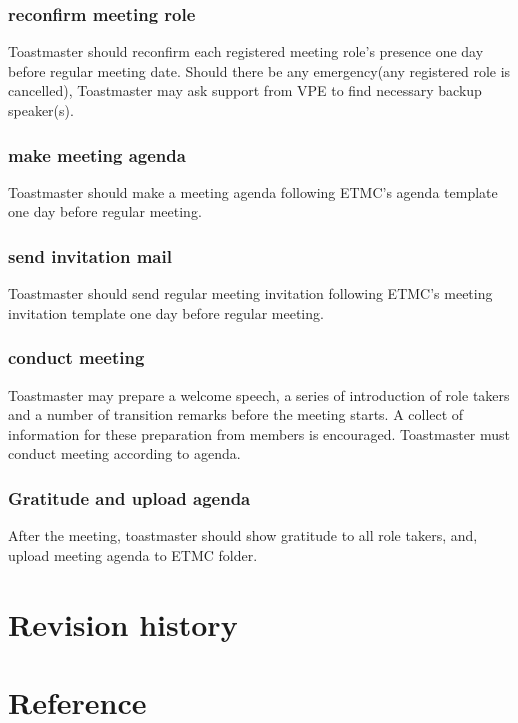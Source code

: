 \subsubsection{reconfirm meeting role}
Toastmaster should reconfirm each registered meeting role's presence one day before 
regular meeting date. Should there be any emergency(any registered role is cancelled),
Toastmaster may ask support from VPE to find necessary backup speaker(s).

\subsubsection{make meeting agenda}
Toastmaster should make a meeting agenda following ETMC's agenda template one day before 
regular meeting.

\subsubsection{send invitation mail}
Toastmaster should send regular meeting invitation following ETMC's meeting invitation 
template one day before regular meeting.

\subsubsection{conduct meeting}
Toastmaster may prepare a welcome speech, a series of introduction of role takers and 
a number of transition remarks before the meeting starts. A collect of information for
these preparation from members is encouraged. Toastmaster must conduct meeting according
to agenda.

\subsubsection{Gratitude and upload agenda}
After the meeting, toastmaster should show gratitude to all role takers, and, upload 
meeting agenda to ETMC folder. 


\section{Revision history}
\section{Reference}



\bye
